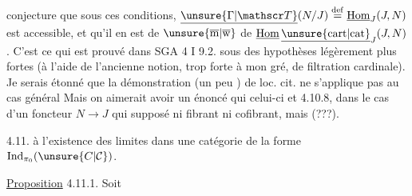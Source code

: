 conjecture que sous ces conditions, $\underline{\unsure{\Gamma|\mathscr T}}(N/J)\overset{\mathrm{def}}{=}\underline{\mathrm{Hom}}_J(J,N)$ est accessible, et qu'il en est de $\unsure{\overline{\mathrm m}|\overline{\mathrm w}}$ de $\underline{\mathrm{Hom}}\,\underline{\unsure{\mathrm{cart}|\mathrm{cat}}}_J(J,N)$. C'est ce qui est prouvé dans SGA 4 I 9.2. sous des hypothèses légèrement plus fortes (à l'aide de l'ancienne notion, trop forte à mon gré, de filtration cardinale). Je serais étonné que la démonstration (un peu ) de loc. cit. ne s'applique pas au cas général Mais on aimerait avoir un énoncé qui  celui-ci et 4.10.8, dans le cas d'un foncteur $N\longrightarrow J$ qui  supposé ni fibrant ni cofibrant, mais  (???).

\noindent\vrule\hspace{0.5em}\parbox{0.93\linewidth}{4.11.  à l'existence des limites dans une catégorie de la forme $\operatorname{Ind}_{\pi_0}(\unsure{C|\mathcal C})$.}

\uline{Proposition} 4.11.1.  Soit
